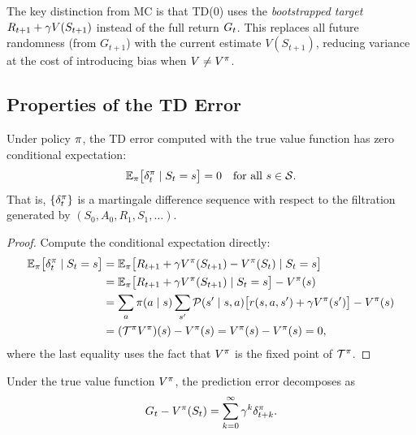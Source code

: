 \documentclass[11pt,a4paper]{article}
\begin{document}
\begin{remark}[Bootstrapping]
\label{rem:bootstrapping}
The key distinction from MC is that TD(0) uses the
\emph{bootstrapped target} $R_{t+1} + \gamma V(S_{t+1})$ instead
of the full return $G_t$. This replaces all future randomness
(from $G_{t+1}$) with the current estimate $V(S_{t+1})$, reducing
variance at the cost of introducing bias when $V \neq V^{\pi}$.
\end{remark}

\subsection{Properties of the TD Error}
\label{subsec:td_error_properties}

\begin{lemma}
\label{lem:td_unbiased}
Under policy $\pi$, the TD error computed with the true value
function has zero conditional expectation:
\begin{equation}
  \mathbb{E}_\pi\bigl[\delta_t^\pi \mid S_t = s\bigr] = 0
  \quad \text{for all } s \in \mathcal{S}.
  \label{eq:td_unbiased}
\end{equation}
That is, $\{\delta_t^\pi\}$ is a martingale difference sequence with
respect to the filtration generated by $(S_0, A_0, R_1, S_1, \ldots)$.
\end{lemma}

\begin{proof}
Compute the conditional expectation directly:
\begin{align}
  \mathbb{E}_\pi\bigl[\delta_t^\pi \mid S_t = s\bigr]
  &= \mathbb{E}_\pi\bigl[R_{t+1} + \gamma V^{\pi}(S_{t+1})
     - V^{\pi}(S_t) \mid S_t = s\bigr] \nonumber\\
  &= \mathbb{E}_\pi\bigl[R_{t+1} + \gamma V^{\pi}(S_{t+1})
     \mid S_t = s\bigr] - V^{\pi}(s) \nonumber\\
  &= \sum_{a} \pi(a \mid s) \sum_{s'} \mathcal{P}(s' \mid s, a)
     \bigl[r(s,a,s') + \gamma V^{\pi}(s')\bigr] - V^{\pi}(s) \nonumber\\
  &= (\mathcal{T}^\pi V^{\pi})(s) - V^{\pi}(s)
   = V^{\pi}(s) - V^{\pi}(s) = 0,
  \label{eq:td_unbiased_proof}
\end{align}
where the last equality uses the fact that $V^{\pi}$ is the fixed point
of $\mathcal{T}^\pi$.
\end{proof}

\begin{keyresult}[title={Return as Telescoping Sum of TD Errors}]
\begin{lemma}
\label{lem:return_telescope}
Under the true value function $V^{\pi}$, the prediction error decomposes as
\begin{equation}
  G_t - V^{\pi}(S_t) = \sum_{k=0}^{\infty} \gamma^k
  \delta_{t+k}^\pi.
  \label{eq:return_telescope}
\end{equation}
\end{lemma}
\end{keyresult}
\end{document}
